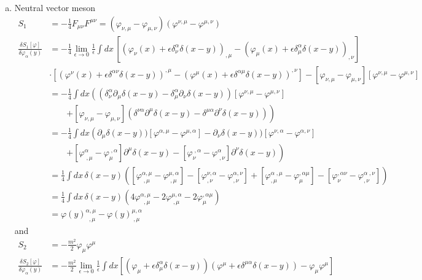 \documentclass[10pt,a4paper]{book}
\theoremstyle{definition}
\begin{document}
\begin{enumerate}[(a)]
\item Neutral vector meson
\begin{align}
S_1&=-\frac{1}{4}F_{\mu\nu}F^{\mu\nu}=(\varphi_{\nu,\mu}-\varphi_{\mu,\nu})(\varphi^{\nu,\mu}-\varphi^{\mu,\nu})\\
\frac{\delta S_1[\varphi]}{\delta\varphi_\alpha(y)}&=-\frac{1}{4}\lim_{\epsilon\rightarrow0}\frac{1}{\epsilon}\int dx\,
[(\varphi_{\nu}(x)+\epsilon\delta^\alpha_\nu\delta(x-y))_{,\mu}-(\varphi_{\mu}(x)+\epsilon\delta^\alpha_\mu\delta(x-y))_{,\nu}]\\
%
&\cdot[(\varphi^{\nu}(x)+\epsilon\delta^{\alpha\nu}\delta(x-y))^{,\mu}-(\varphi^{\mu}(x)+\epsilon\delta^{\alpha\mu}\delta(x-y))^{,\nu}]-
[\varphi_{\nu,\mu}-\varphi_{\mu,\nu}]
[\varphi^{\nu,\mu}-\varphi^{\mu,\nu}]\\
%
&=-\frac{1}{4}\int dx\left((\delta_\nu^\alpha\partial_\mu\delta(x-y)-\delta_\mu^\alpha\partial_\nu\delta(x-y))[\varphi^{\nu,\mu}-\varphi^{\mu,\nu}]\right.\\
&\qquad\left.+[\varphi_{\nu,\mu}-\varphi_{\mu,\nu}](\delta^{\nu\alpha}\partial^\mu\delta(x-y)-\delta^{\mu\alpha}\partial^\nu\delta(x-y))\right)\\
&=-\frac{1}{4}\int dx\left(
 \partial_\mu\delta(x-y))[\varphi^{\alpha,\mu}-\varphi^{\mu,\alpha}]
-\partial_\nu\delta(x-y))[\varphi^{\nu,\alpha}-\varphi^{\alpha,\nu}]\right.\\
&\qquad\left.
+[\varphi^\alpha_{\;,\mu}-\varphi_{\mu}^{\;,\alpha}]\partial^\mu\delta(x-y)
-[\varphi_{\nu}^{\;,\alpha}-\varphi^{\alpha}_{\;,\nu}]\partial^\nu\delta(x-y)
\right)\\
&=\frac{1}{4}\int dx\,\delta(x-y)\left(
[\varphi^{\alpha,\mu}_{\;,\mu}-\varphi^{\mu,\alpha}_{\;,\mu}]
-[\varphi^{\nu,\alpha}_{,\nu}-\varphi^{\alpha,\nu}_{,\nu}]
+[\varphi^{\alpha\;,\mu}_{,\mu}-\varphi_{\mu}^{,\alpha\mu}]
-[\varphi_{\nu}^{,\alpha\nu}-\varphi^{\alpha\;,\nu}_{,\nu}]
\right)\\
&=\frac{1}{4}\int dx\,\delta(x-y)\left(
4\varphi^{\alpha,\mu}_{\;\;,\mu}-
2\varphi^{\mu,\alpha}_{\;,\mu}-
2\varphi_{\mu}^{,\alpha\mu}
\right)\\
&=\varphi(y)^{\alpha,\mu}_{\;\;,\mu}-\varphi(y)^{\mu,\alpha}_{\;,\mu}
\end{align}
and
\begin{align}
S_2&=-\frac{m^2}{2}\varphi_\mu\varphi^\mu\\
\frac{\delta S_2[\varphi]}{\delta\varphi_\alpha(y)}&=-\frac{m^2}{2}
\lim_{\epsilon\rightarrow0}\frac{1}{\epsilon}\int dx
\left[(\varphi_\mu+\epsilon\delta_\mu^\alpha\delta(x-y))(\varphi^\mu+\epsilon\delta^{\mu\alpha}\delta(x-y))-\varphi_\mu\varphi^\mu\right]\\

\end{align}
\end{enumerate}
\end{document}
